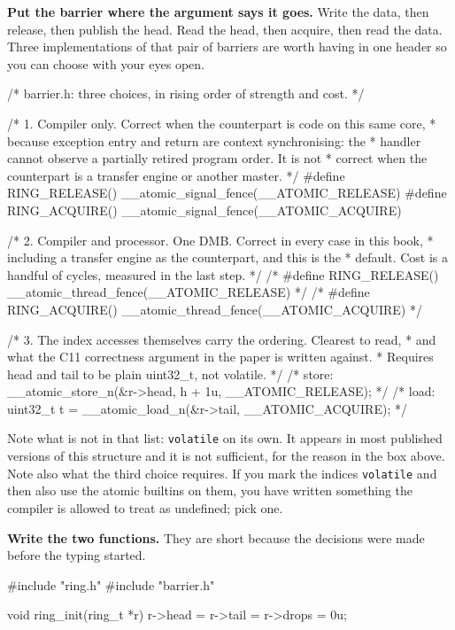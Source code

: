 \begin{steps}
\item \textbf{Put the barrier where the argument says it goes.} Write the data,
then release, then publish the head. Read the head, then acquire, then read the
data. Three implementations of that pair of barriers are worth having in one
header so you can choose with your eyes open.
\begin{ccode}
/* barrier.h: three choices, in rising order of strength and cost. */

/* 1. Compiler only. Correct when the counterpart is code on this same core,
 *    because exception entry and return are context synchronising: the
 *    handler cannot observe a partially retired program order. It is not
 *    correct when the counterpart is a transfer engine or another master. */
#define RING_RELEASE()  __atomic_signal_fence(__ATOMIC_RELEASE)
#define RING_ACQUIRE()  __atomic_signal_fence(__ATOMIC_ACQUIRE)

/* 2. Compiler and processor. One DMB. Correct in every case in this book,
 *    including a transfer engine as the counterpart, and this is the
 *    default. Cost is a handful of cycles, measured in the last step. */
/* #define RING_RELEASE()  __atomic_thread_fence(__ATOMIC_RELEASE) */
/* #define RING_ACQUIRE()  __atomic_thread_fence(__ATOMIC_ACQUIRE) */

/* 3. The index accesses themselves carry the ordering. Clearest to read,
 *    and what the C11 correctness argument in the paper is written against.
 *    Requires head and tail to be plain uint32_t, not volatile. */
/* store: __atomic_store_n(&r->head, h + 1u, __ATOMIC_RELEASE);            */
/* load:  uint32_t t = __atomic_load_n(&r->tail, __ATOMIC_ACQUIRE);        */
\end{ccode}
Note what is not in that list: \texttt{volatile} on its own. It appears in most
published versions of this structure and it is not sufficient, for the reason in
the box above. Note also what the third choice requires. If you mark the indices
\texttt{volatile} and then also use the atomic builtins on them, you have
written something the compiler is allowed to treat as undefined; pick one.

\item \textbf{Write the two functions.} They are short because the decisions
were made before the typing started.
\begin{ccode}
#include "ring.h"
#include "barrier.h"

void ring_init(ring_t *r)
{
    r->head = r->tail = r->drops = 0u;
}


\end{ccode}
\end{steps}

